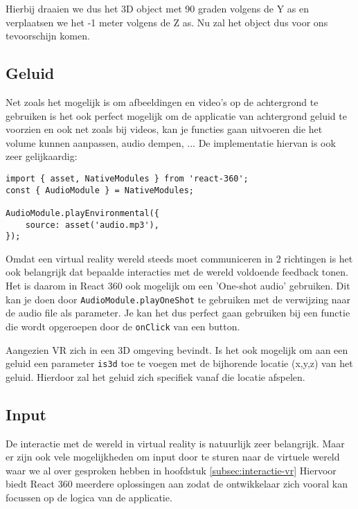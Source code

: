 Hierbij draaien we dus het 3D object met 90 graden volgens de Y as en verplaatsen we het -1 meter volgens de Z as. Nu zal het object dus voor ons tevoorschijn komen.

\subsection{Geluid}
\label{subsec:Geluid}
Net zoals het mogelijk is om afbeeldingen en video's op de achtergrond te gebruiken is het ook perfect mogelijk om de applicatie van achtergrond geluid te voorzien en ook net zoals bij videos, kan je functies gaan uitvoeren die het volume kunnen aanpassen, audio dempen, ... De implementatie hiervan is ook zeer gelijkaardig:

\begin{lstlisting}[frame=single, caption=Voorbeeld van een Entity component]
import { asset, NativeModules } from 'react-360';
const { AudioModule } = NativeModules;

AudioModule.playEnvironmental({
	source: asset('audio.mp3'),
});
\end{lstlisting}

Omdat een virtual reality wereld steeds moet communiceren in 2 richtingen is het ook belangrijk dat bepaalde interacties met de wereld voldoende feedback tonen. Het is daarom in React 360 ook mogelijk om een 'One-shot audio' gebruiken. Dit kan je doen door \lstinline[basicstyle=\ttfamily\color{red}]|AudioModule.playOneShot| te gebruiken met de verwijzing naar de audio file als parameter. Je kan het dus perfect gaan gebruiken bij een functie die wordt opgeroepen door de \lstinline[basicstyle=\ttfamily\color{red}]|onClick| van een button.

Aangezien VR zich in een 3D omgeving bevindt. Is het ook mogelijk om aan een geluid een parameter \lstinline[basicstyle=\ttfamily\color{red}]|is3d| toe te voegen met de bijhorende locatie (x,y,z) van het geluid. Hierdoor zal het geluid zich specifiek vanaf die locatie afspelen.


\subsection{Input}
\label{subsec:input-vr}
De interactie met de wereld in virtual reality is natuurlijk zeer belangrijk. Maar er zijn ook vele mogelijkheden om input door te sturen naar de virtuele wereld waar we al over gesproken hebben in hoofdstuk \ref{subsec:interactie-vr} Hiervoor biedt React 360 meerdere oplossingen aan zodat de ontwikkelaar zich vooral kan focussen op de logica van de applicatie.

